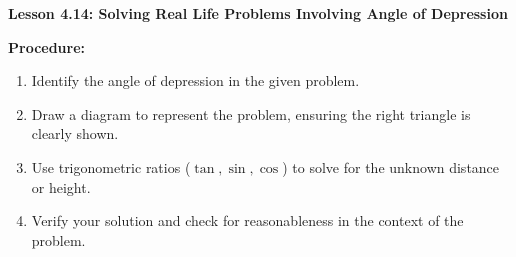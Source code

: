 \begin{center}
\textbf{Lesson 4.14: Solving Real Life Problems Involving Angle of Depression}
\end{center}

\vspace*{-1.5ex}

\noindent \textbf{Procedure:}
    \begin{enumerate}
        \item Identify the angle of depression in the given problem.
        \item Draw a diagram to represent the problem, ensuring the right triangle is clearly shown.
        \item Use trigonometric ratios (\(\tan, \sin, \cos\)) to solve for the unknown distance or height.
        \item Verify your solution and check for reasonableness in the context of the problem.
    \end{enumerate}
